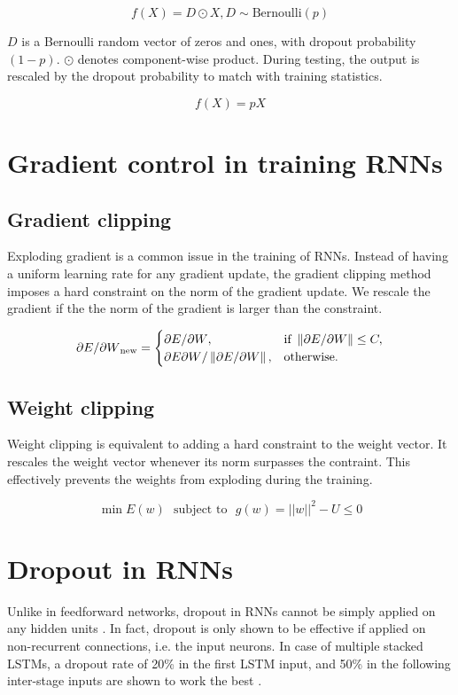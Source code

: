 \begin{equation}
f(X) = D \odot X, D \sim \text{Bernoulli}(p)
\end{equation}

$D$ is a Bernoulli random vector of zeros and ones, with dropout probability $(1-p)$. $\odot$ denotes component-wise product. During testing, the output is rescaled by the dropout probability to match with training statistics. 

\begin{equation}
f(X) = pX
\end{equation}

\section{Gradient control in training RNNs}
\subsection{Gradient clipping}
Exploding gradient is a common issue in the training of RNNs. Instead of having a uniform learning rate for any gradient update, the gradient clipping method \cite{pascanu13} imposes a hard constraint on the norm of the gradient update. We rescale the gradient if the the norm of the gradient is larger than the constraint.

\begin{equation}
{\partial E} / {\partial W}_{\text{new}} = \begin{cases}
  {\partial E} / {\partial W} , & \text{if } \left\lVert{\partial E} / {\partial W}\right\rVert \le C, \\
  {\partial E}{\partial W} / \left\lVert{\partial E} / {\partial W}\right\rVert, & \text{otherwise}.
\end{cases}
\end{equation}

\subsection{Weight clipping}
Weight clipping is equivalent to adding a hard constraint to the weight vector. It rescales the weight vector whenever its norm surpasses the contraint. This effectively prevents the weights from exploding during the training. 

\begin{equation}
\min E(w)\ \ \ \text{subject to}\ \ \ g(w) = ||w||^2 - U \le 0
\end{equation}

\section{Dropout in RNNs}
Unlike in feedforward networks, dropout in RNNs cannot be simply applied on any hidden units \cite{zaremba14}. In fact, dropout is only shown to be effective if applied on non-recurrent connections, i.e. the input neurons. In case of multiple stacked LSTMs, a dropout rate of 20\% in the first LSTM input, and 50\% in the following inter-stage inputs are shown to work the best \cite{zaremba14}.


